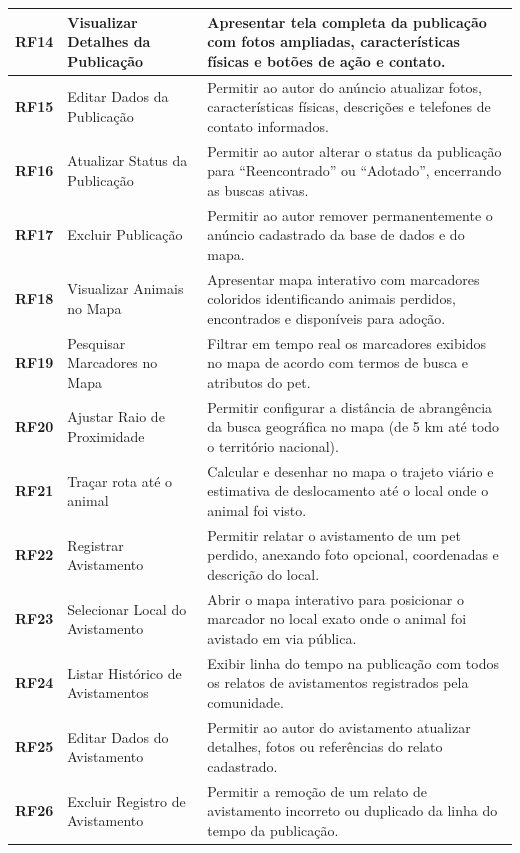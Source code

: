 {\begin{longtable}{|>{\centering\arraybackslash}p{1.3cm}|>{\raggedright\arraybackslash}p{4.2cm}|>{\raggedright\arraybackslash}p{8.8cm}|}
\textbf{RF14} & Visualizar Detalhes da Publicação & Apresentar tela completa da publicação com fotos ampliadas, características físicas e botões de ação e contato. \\ \hline
\textbf{RF15} & Editar Dados da Publicação & Permitir ao autor do anúncio atualizar fotos, características físicas, descrições e telefones de contato informados. \\ \hline
\textbf{RF16} & Atualizar Status da Publicação & Permitir ao autor alterar o status da publicação para ``Reencontrado'' ou ``Adotado'', encerrando as buscas ativas. \\ \hline
\textbf{RF17} & Excluir Publicação & Permitir ao autor remover permanentemente o anúncio cadastrado da base de dados e do mapa. \\ \hline
\textbf{RF18} & Visualizar Animais no Mapa & Apresentar mapa interativo com marcadores coloridos identificando animais perdidos, encontrados e disponíveis para adoção. \\ \hline
\textbf{RF19} & Pesquisar Marcadores no Mapa & Filtrar em tempo real os marcadores exibidos no mapa de acordo com termos de busca e atributos do pet. \\ \hline
\textbf{RF20} & Ajustar Raio de Proximidade & Permitir configurar a distância de abrangência da busca geográfica no mapa (de 5 km até todo o território nacional). \\ \hline
\textbf{RF21} & Traçar rota até o animal & Calcular e desenhar no mapa o trajeto viário e estimativa de deslocamento até o local onde o animal foi visto. \\ \hline
\textbf{RF22} & Registrar Avistamento & Permitir relatar o avistamento de um pet perdido, anexando foto opcional, coordenadas e descrição do local. \\ \hline
\textbf{RF23} & Selecionar Local do Avistamento & Abrir o mapa interativo para posicionar o marcador no local exato onde o animal foi avistado em via pública. \\ \hline
\textbf{RF24} & Listar Histórico de Avistamentos & Exibir linha do tempo na publicação com todos os relatos de avistamentos registrados pela comunidade. \\ \hline
\textbf{RF25} & Editar Dados do Avistamento & Permitir ao autor do avistamento atualizar detalhes, fotos ou referências do relato cadastrado. \\ \hline
\textbf{RF26} & Excluir Registro de Avistamento & Permitir a remoção de um relato de avistamento incorreto ou duplicado da linha do tempo da publicação. \\ \hline

\end{longtable}}
